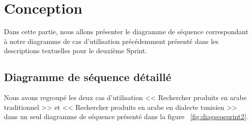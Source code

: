 \section{Conception}
\noindent
Dans cette partie, nous allons présenter le diagramme de séquence correspondant à notre diagramme de cas d'utilisation précédemment présenté dans les descriptions textuelles pour le deuxième Sprint.

\subsection{Diagramme de séquence détaillé}
\noindent
Nous avons regroupé les deux cas d'utilisation << Rechercher produits en arabe traditionnel >> et << Rechercher produits en arabe en dialecte tunisien >> dans un seul diagramme de séquence présenté dans la figure ~\ref{fig:diagseqsprint2}.


